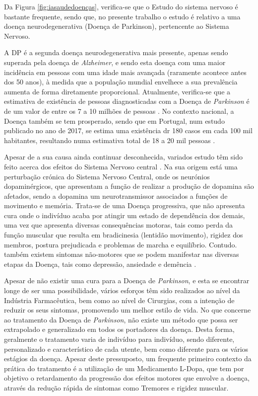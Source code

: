 \documentclass[12pt,a4paper,twoside]{report}
\begin{document}
{Da Figura \ref{fig:iasaudedoenças}, verifica-se que o Estudo do sistema nervoso é bastante frequente, sendo que, no presente trabalho o estudo é relativo a uma doença neurodegenerativa (Doença de Parkinson), pertencente ao Sistema Nervoso.

A \gls{DP} é a segunda doença neurodegenerativa mais presente, apenas sendo superada pela doença de \textit{Alzheimer}, e sendo esta doença com uma maior incidência em pessoas com uma idade mais avançada (raramente acontece antes dos 50 anos), à medida que a população mundial envelhece a sua prevalência aumenta de forma diretamente proporcional. Atualmente, verifica-se que a estimativa de existência de pessoas diagnosticadas com a Doença de \textit{Parkinson} é de um valor de entre os 7 a 10 milhões de pessoas \cite{ferreiraPortugal}. No contexto nacional, a Doença também se tem prosperado, sendo que em Portugal, num estudo publicado no ano de 2017, se estima uma existência dr 180 casos em cada 100 mil habitantes, resultando numa estimativa total de 18 a 20 mil pessoas \cite{spn2024}.

Apesar de a sua causa ainda continuar desconhecida, variados estudo têm sido feito acerca dos efeitos do Sistema Nervoso central \cite{Cabreira_Massano_2019}. Na sua origem está uma perturbação crónica do Sistema Nervoso Central, onde os neurónios dopaminérgicos, que apresentam a função de realizar a produção de dopamina são afetados, sendo a dopamina um neurotransmissor associados a funções de movimento e memória. Trata-se de uma Doença progressiva, que não apresenta cura onde o indivíduo acaba por atingir um estado de dependência dos demais, uma vez que apresenta diversas consequências motoras, tais como perda da função muscular que resulta em bradicinesia (lentidão
movimento), rigidez dos membros, postura prejudicada e problemas de marcha e equilíbrio. Contudo. também existem sintomas não-motores que se podem manifestar nas diversas etapas da Doença, tais como depressão, ansiedade e demência \cite{Cabreira_Massano_2019} \cite{silviadeldin}.


Apesar de não existir uma cura para a Doença de \textit{Parkinson}, e esta se encontrar longe de ser uma possibilidade, vários esforços têm sido realizados ao nível da Indústria Farmacêutica, bem como ao nível de Cirurgias, com a intenção de reduzir os seus sintomas, promovendo um melhor estilo de vida.
No que concerne ao tratamento da Doença de \textit{Parkinson}, não existe um método que possa ser extrapolado e generalizado em todos os portadores da doença. Desta forma, geralmente o tratamento varia de indivíduo para indivíduo, sendo diferente, personalizado e característico de cada utente, bem como diferente para os vários estágios da doença. Apesar deste pressuposto, um frequente primeiro contexto da prática do tratamento é a utilização de um Medicamento \gls{L-Dopa}, que tem por objetivo o retardamento da progressão dos efeitos motores que envolve a doença, através da redução rápida de sintomas como Tremores e rigidez muscular.


}
\end{document}
